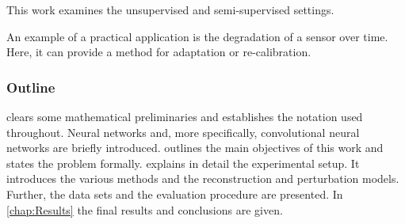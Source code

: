 This work examines the unsupervised and semi-supervised settings.


An example of a practical application is
the degradation of a sensor over time.
Here, it can provide a method for adaptation or re-calibration.


\subsubsection{Outline}

 clears some mathematical preliminaries and establishes the notation 
used throughout. Neural networks and, 
more specifically, convolutional neural networks are briefly introduced.
 outlines the main objectives of this work and 
states the problem formally.
 explains in detail the experimental setup.
It introduces the various methods and the reconstruction and perturbation models.
Further, the data sets and the evaluation procedure are presented.
In \cref{chap:Results} the final results and conclusions are given.
